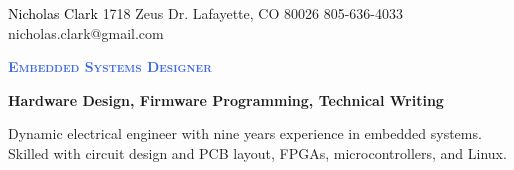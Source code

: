 \documentclass[letterpaper, 10pt]{article}
\newcommand{\NrcColorName}{Black}
\newcommand{\NrcColorTitle}{RoyalBlue}
\begin{document}
%
\nrctitle
{\textcolor{\NrcColorName}{Nicholas Clark}}
{1718 Zeus Dr.}
{Lafayette, CO 80026}
{805-636-4033}
{nicholas.clark@gmail.com}
%
\begin{center}\par\smallskip
\textcolor{\NrcColorTitle}{\Large \textbf{\textsc{Embedded Systems Designer}}}\par
\large \textbf{{Hardware Design, Firmware Programming, Technical Writing}}\par
\smallskip
\noindent \begin{minipage}[t]{0.75\textwidth}%
\begin{sloppypar}
Dynamic electrical engineer with nine years experience in embedded systems. 
Skilled with circuit design and PCB layout, FPGAs, microcontrollers, and Linux.
\end{sloppypar}
\end{minipage}
\end{center}
\par \smallskip \smallskip
%
%
\end{document}
